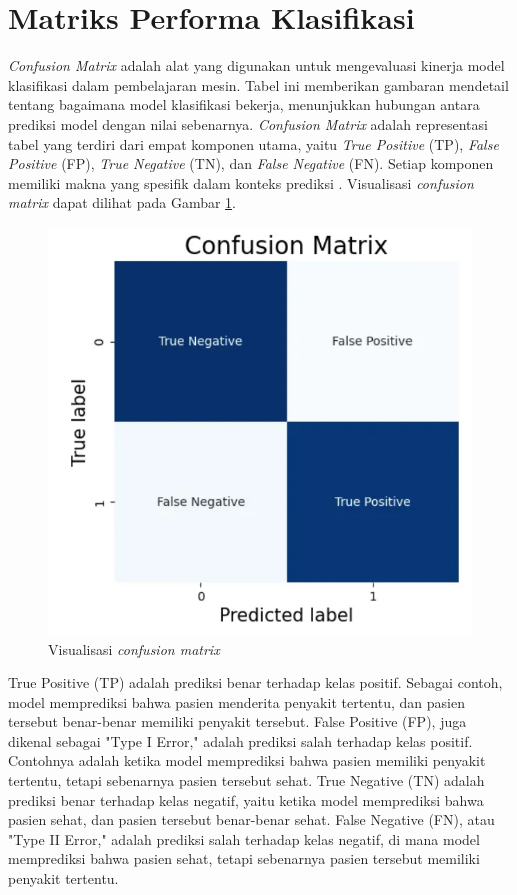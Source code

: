 
\section{Matriks Performa Klasifikasi}

\emph{Confusion Matrix} adalah alat yang digunakan untuk mengevaluasi kinerja model klasifikasi dalam pembelajaran mesin. Tabel ini memberikan gambaran mendetail tentang bagaimana model klasifikasi bekerja, menunjukkan hubungan antara prediksi model dengan nilai sebenarnya. \emph{Confusion Matrix} adalah representasi tabel yang terdiri dari empat komponen utama, yaitu \emph{True Positive} (TP), \emph{False Positive} (FP), \emph{True Negative} (TN), dan \emph{False Negative} (FN). Setiap komponen memiliki makna yang spesifik dalam konteks prediksi \parencite{provost2013data}. Visualisasi \emph{confusion matrix} dapat dilihat pada Gambar \ref{fig:confusion}. 

\begin{figure} [ht] \centering
    \includegraphics[width=.4\textwidth]{gambar/bab2/confusion.png}
    \caption{Visualisasi \emph{confusion matrix}}
    \label{fig:confusion}
\end{figure}

True Positive (TP) adalah prediksi benar terhadap kelas positif. Sebagai contoh, model memprediksi bahwa pasien menderita penyakit tertentu, dan pasien tersebut benar-benar memiliki penyakit tersebut. False Positive (FP), juga dikenal sebagai "Type I Error," adalah prediksi salah terhadap kelas positif. Contohnya adalah ketika model memprediksi bahwa pasien memiliki penyakit tertentu, tetapi sebenarnya pasien tersebut sehat. True Negative (TN) adalah prediksi benar terhadap kelas negatif, yaitu ketika model memprediksi bahwa pasien sehat, dan pasien tersebut benar-benar sehat. False Negative (FN), atau "Type II Error," adalah prediksi salah terhadap kelas negatif, di mana model memprediksi bahwa pasien sehat, tetapi sebenarnya pasien tersebut memiliki penyakit tertentu. 

